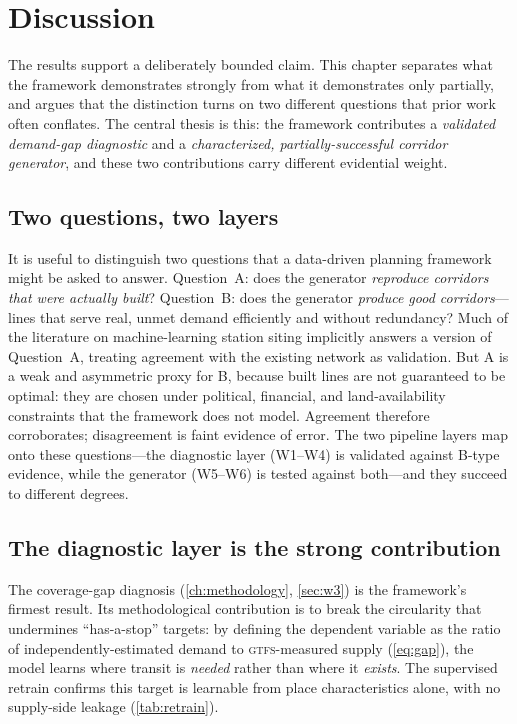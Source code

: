 \chapter{Discussion}
\label{ch:discussion}

The results support a deliberately bounded claim. This chapter separates what the
framework demonstrates strongly from what it demonstrates only partially, and argues
that the distinction turns on two different questions that prior work often conflates.
The central thesis is this: the framework contributes a \emph{validated demand-gap
diagnostic} and a \emph{characterized, partially-successful corridor generator}, and
these two contributions carry different evidential weight.

\section{Two questions, two layers}
\label{sec:disc-twoquestions}

It is useful to distinguish two questions that a data-driven planning framework might
be asked to answer. Question~A: does the generator \emph{reproduce corridors that were
actually built}? Question~B: does the generator \emph{produce good corridors}---lines
that serve real, unmet demand efficiently and without redundancy? Much of the
literature on machine-learning station siting implicitly answers a version of
Question~A, treating agreement with the existing network as validation. But A is a
weak and asymmetric proxy for B, because built lines are not guaranteed to be optimal:
they are chosen under political, financial, and land-availability constraints that the
framework does not model. Agreement therefore corroborates; disagreement is faint
evidence of error. The two pipeline layers map onto these questions---the diagnostic
layer (W1--W4) is validated against B-type evidence, while the generator (W5--W6) is
tested against both---and they succeed to different degrees.

\section{The diagnostic layer is the strong contribution}
\label{sec:disc-diagnostic}

The coverage-gap diagnosis (\cref{ch:methodology}, \cref{sec:w3}) is the framework's
firmest result. Its methodological contribution is to break the circularity that
undermines ``has-a-stop'' targets: by defining the dependent variable as the ratio of
independently-estimated demand to \textsc{gtfs}-measured supply
(\cref{eq:gap}), the model learns where transit is \emph{needed} rather than where it
\emph{exists}. The supervised retrain confirms this target is learnable from
place characteristics alone, with no supply-side leakage (\cref{tab:retrain}).

